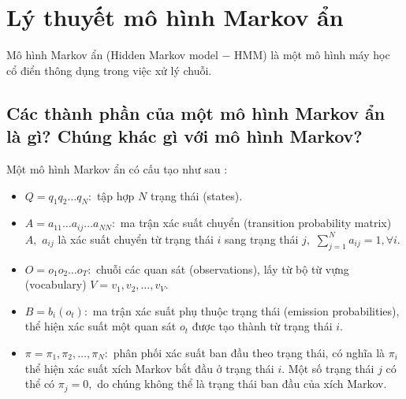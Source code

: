 \section{Lý thuyết mô hình Markov ẩn}
Mô hình Markov ẩn (Hidden Markov model $-$ HMM) là một mô hình máy học cổ điển thông dụng trong việc xử lý chuỗi.
\subsection{Các thành phần của một mô hình Markov ẩn là gì? Chúng khác gì với mô hình Markov?}
Một mô hình Markov ẩn có cấu tạo như sau \supercite{angrybird, hmm2021}:
\begin{mybox}
\begin{itemize}
\item $Q = {q_1}{q_2} \ldots {q_N}:$ tập hợp $N$ trạng thái (states).
\item $A = {a_{11}} \ldots {a_{ij}} \ldots {a_{NN}}:$ ma trận xác suất chuyển (transition probability matrix) $A,$ $a_{ij}$ là xác suất chuyển từ trạng thái $i$ sang trạng thái $j,$ $\sum\limits_{j = 1}^N {{a_{ij}}}  = 1,\forall i.$
\item $O = {o_1}{o_2} \ldots {o_T}:$ chuỗi các quan sát (observations), lấy từ bộ từ vựng (vocabulary) $V = {v_1}, {v_2}, \ldots, {v_V}.$
\item $B = b_i \left( {o_t} \right):$ ma trận xác suất phụ thuộc trạng thái (emission probabilities), thể hiện xác suất một quan sát $o_t$ được tạo thành từ trạng thái $i.$
\item $\pi = {\pi_1}, {\pi_2}, \ldots, {\pi_N}:$ phân phối xác suất ban đầu theo trạng thái, có nghĩa là $\pi_i$ thể hiện xác suất xích Markov bắt đầu ở trạng thái $i.$ Một số trạng thái $j$ có thể có $\pi_j = 0,$ do chúng không thể là trạng thái ban đầu của xích Markov.
\end{itemize}
\end{mybox}
